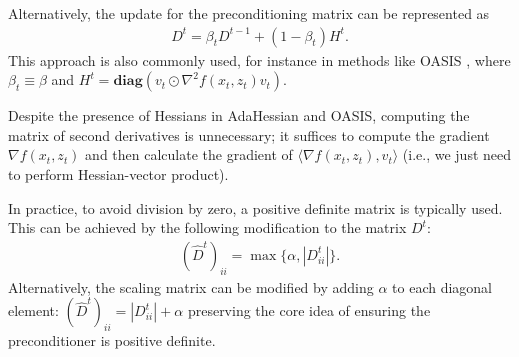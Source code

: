 \documentclass[sn-mathphys,Numbered]{sn-jnl}%
\renewcommand{\|}{\parallel}
\renewcommand {\*} {\ast}
\begin{document}
Alternatively, the update for the preconditioning matrix can be represented as
\begin{align}
    \label{eq:linear-update}
    D^{t} = \beta_tD^{t-1}+ (1 - \beta_t)H^{t}.
\end{align}
This approach is also commonly used, for instance in methods like OASIS \cite{jahani2021doubly}, 
where $\beta_t \equiv \beta$ and 
$H^t = \textbf{diag}\left(v_t \odot \nabla^2 f(x_t, z_t) v_t \right)$.




Despite the presence of Hessians in AdaHessian and OASIS, computing the matrix of second derivatives is unnecessary; it suffices to compute the gradient 
$\nabla f(x_t, z_t)$
 and then calculate the gradient of 
 $\langle \nabla f(x_t, z_t), v_t \rangle$ (i.e., we just need to perform Hessian-vector product).


In practice, to avoid division by zero, a positive definite matrix is typically used. This can be achieved by the following modification to the matrix  $D^t$:
\begin{align}
    \label{eq:positive-definite}
    (\hat{D}^t)_{ii} = \max\{\alpha, |D^t_{ii}|\}.
\end{align}
Alternatively, the scaling matrix can be modified by adding 
$\alpha$ to each diagonal element: 
$(\hat{D}^t)_{ii} = |D^t_{ii}| + \alpha$
preserving the core idea of ensuring the preconditioner is positive definite.
\end{document}
